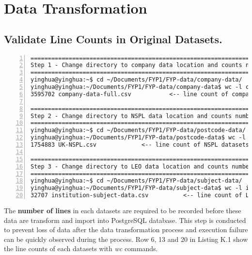\chapter{Data Transformation} 
\label{AppendixK} 


\section{Validate Line Counts in Original Datasets.}

\lstset{basicstyle=\ttfamily\tiny}  
\begin{lstlisting}[breaklines, frame=single, numbers=left, caption={Validate lines counts in CSV datasets.}, label=commandline-02]
======================================================================================
Step 1 - Change directory to company data location and counts number of lines in file. 
======================================================================================
yinghua@yinghua:~$ cd ~/Documents/FYP1/FYP-data/company-data/
yinghua@yinghua:~/Documents/FYP1/FYP-data/company-data$ wc -l company-data-full.csv 
3595702 company-data-full.csv 			<-- line count of company datasets

======================================================================================
Step 2 - Change directory to NSPL data location and counts number of lines in file. 
======================================================================================
yinghua@yinghua:~$ cd ~/Documents/FYP1/FYP-data/postcode-data/
yinghua@yinghua:~/Documents/FYP1/FYP-data/postcode-data$ wc -l UK-NSPL.csv 
1754883 UK-NSPL.csv				<-- line count of NSPL datasets

======================================================================================
Step 3 - Change directory to LEO data location and counts number of lines in file. 
======================================================================================
yinghua@yinghua:~$ cd ~/Documents/FYP1/FYP-data/subject-data/
yinghua@yinghua:~/Documents/FYP1/FYP-data/subject-data$ wc -l institution-subject-data.csv 
32707 institution-subject-data.csv  		<-- line count of LEO datasets
\end{lstlisting}

The \textbf{number of lines} in each datasets are required to be recorded before these data are transform and import into PostgreSQL database. This step is conducted to prevent loss of data after the data transformation process and execution failure can be quickly observed during the process. Row 6, 13 and 20 in Listing K.1 show the line counts of each datasets with \textit{wc} commands. 

